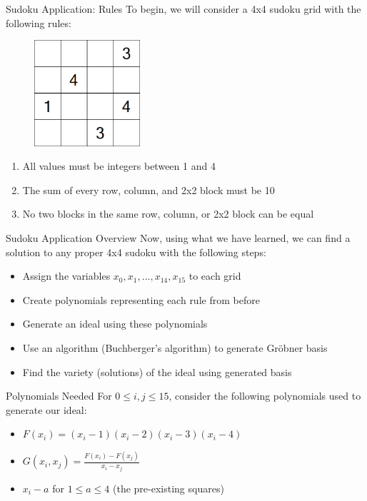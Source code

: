 \documentclass{beamer}
\begin{document}
\begin{frame}{Sudoku Application: Rules}
To begin, we will consider a 4x4 sudoku grid with the following rules:
\begin{figure} 
    \centering
    \includegraphics[width=0.35\textwidth]{images/1.png}
\end{figure}
\pause
\begin{enumerate}
    \item All values must be integers between 1 and 4 \pause
    \item The sum of every row, column, and 2x2 block must be 10 \pause
    \item No two blocks in the same row, column, or 2x2 block can be equal
\end{enumerate}
\end{frame}

\begin{frame}{Sudoku Application Overview}
Now, using what we have learned, we can find a solution to any proper 4x4 sudoku with the following steps:
\pause
    \begin{itemize}
        \item Assign the variables $x_0, x_1, ... , x_{14}, x_{15}$ to each grid \pause
        \item Create polynomials representing each rule from before \pause
        \item Generate an ideal using these polynomials \pause
        \item Use an algorithm (Buchberger's algorithm) to generate Gröbner basis \pause
        \item Find the variety (solutions) of the ideal using generated basis
    \end{itemize}
\end{frame}
\begin{frame}{Polynomials Needed}
For $0 \leq i, j\leq 15$, consider the following polynomials used to generate our ideal:
\newline
\pause
    \begin{itemize}
    
        \item $F(x_i) = (x_i-1)(x_i-2)(x_i-3)(x_i-4)$
        \newline 
        \pause
        \item $G(x_i, x_j) = \frac{F(x_i)-F(x_j)}{x_i - x_j}$
        \newline
        \pause
        \item $x_i - a$ for $1\leq a \leq 4$ (the pre-existing squares)
    \end{itemize}
\end{frame}
\end{document}

